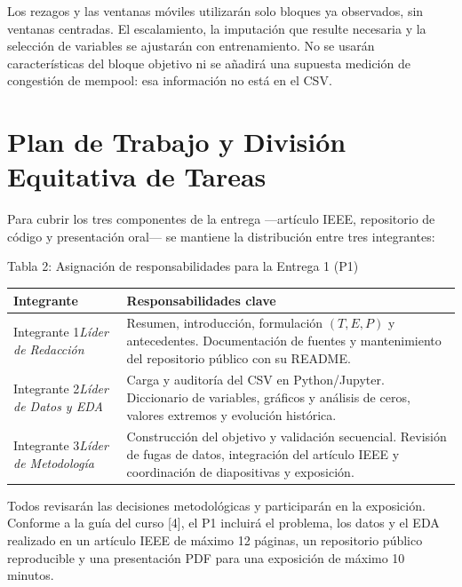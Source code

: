 \documentclass[11pt,a4paper]{article}
\begin{document}
Los rezagos y las ventanas móviles utilizarán solo bloques ya observados, sin ventanas centradas. El escalamiento, la imputación que resulte necesaria y la selección de variables se ajustarán con entrenamiento. No se usarán características del bloque objetivo ni se añadirá una supuesta medición de congestión de mempool: esa información no está en el CSV.

\section{Plan de Trabajo y División Equitativa de Tareas}

Para cubrir los tres componentes de la entrega ---artículo IEEE, repositorio de código y presentación oral--- se mantiene la distribución entre tres integrantes:

\begin{center}
{\small Tabla 2: Asignación de responsabilidades para la Entrega 1 (P1)}\par
\begin{tabularx}{\linewidth}{@{}>{\raggedright\arraybackslash}p{3.4cm} X@{}}
\hline
\textbf{Integrante} & \textbf{Responsabilidades clave}\\\hline
Integrante 1\newline\textit{Líder de Redacción} & Resumen, introducción, formulación $(T,E,P)$ y antecedentes. Documentación de fuentes y mantenimiento del repositorio público con su README.\\[6pt]
Integrante 2\newline\textit{Líder de Datos y EDA} & Carga y auditoría del CSV en Python/Jupyter. Diccionario de variables, gráficos y análisis de ceros, valores extremos y evolución histórica.\\[6pt]
Integrante 3\newline\textit{Líder de Metodología} & Construcción del objetivo y validación secuencial. Revisión de fugas de datos, integración del artículo IEEE y coordinación de diapositivas y exposición.\\\hline
\end{tabularx}
\end{center}

Todos revisarán las decisiones metodológicas y participarán en la exposición. Conforme a la guía del curso [4], el P1 incluirá el problema, los datos y el EDA realizado en un artículo IEEE de máximo 12 páginas, un repositorio público reproducible y una presentación PDF para una exposición de máximo 10 minutos.
\end{document}
